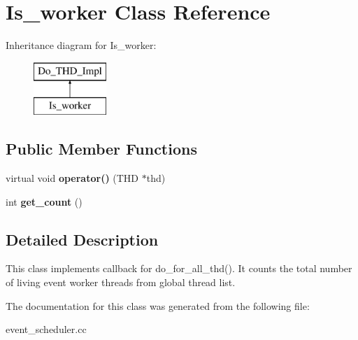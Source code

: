 \hypertarget{classIs__worker}{}\section{Is\+\_\+worker Class Reference}
\label{classIs__worker}
Inheritance diagram for Is\+\_\+worker\+:\begin{figure}[H]
\begin{center}
\leavevmode
\includegraphics[height=2.000000cm]{classIs__worker}
\end{center}
\end{figure}
\subsection*{Public Member Functions}
\begin{DoxyCompactItemize}
\item 
\mbox{\label{classIs__worker_af54478c4de3aaeea05c38c5e0b3d2a9e}} 
virtual void {\bfseries operator()} (T\+HD $\ast$thd)
\item 
\mbox{\label{classIs__worker_adc1a744c9933270f44d63234a07749dd}} 
int {\bfseries get\+\_\+count} ()
\end{DoxyCompactItemize}


\subsection{Detailed Description}
This class implements callback for do\+\_\+for\+\_\+all\+\_\+thd(). It counts the total number of living event worker threads from global thread list. 

The documentation for this class was generated from the following file\+:\begin{DoxyCompactItemize}
\item 
event\+\_\+scheduler.\+cc\end{DoxyCompactItemize}
